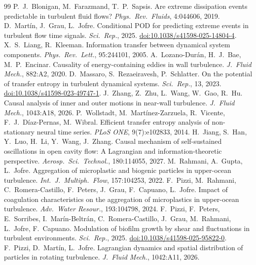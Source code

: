 \documentclass[11pt]{article}
\begin{document}
\begin{thebibliography}{99}
 P.\ J.\ Blonigan, M.\ Farazmand, T.\ P.\ Sapsis. Are extreme dissipation events predictable in turbulent fluid flows? \emph{Phys.\ Rev.\ Fluids}, 4:044606, 2019.
 D.\ Mart\'in, J.\ Grau, L.\ Jofre. Conditional POD for predicting extreme events in turbulent flow time signals. \emph{Sci.\ Rep.}, 2025. \href{https://doi.org/10.1038/s41598-025-14804-4}{doi:10.1038/s41598-025-14804-4}.
 X.\ S.\ Liang, R.\ Kleeman. Information transfer between dynamical system components. \emph{Phys.\ Rev.\ Lett.}, 95:244101, 2005.
 A.\ Lozano-Dur\'an, H.\ J.\ Bae, M.\ P.\ Encinar. Causality of energy-containing eddies in wall turbulence. \emph{J.\ Fluid Mech.}, 882:A2, 2020.
 D.\ Massaro, S.\ Rezaeiravesh, P.\ Schlatter. On the potential of transfer entropy in turbulent dynamical systems. \emph{Sci.\ Rep.}, 13, 2023. \href{https://doi.org/10.1038/s41598-023-49747-1}{doi:10.1038/s41598-023-49747-1}.
 J.\ Zhang, Z.\ Zhu, L.\ Wang, W.\ Gao, R.\ Hu. Causal analysis of inner and outer motions in near-wall turbulence. \emph{J.\ Fluid Mech.}, 1043:A18, 2026.
 P.\ Wollstadt, M.\ Mart\'inez-Zarzuela, R.\ Vicente, F.\ J.\ D\'iaz-Pernas, M.\ Wibral. Efficient transfer entropy analysis of non-stationary neural time series. \emph{PLoS ONE}, 9(7):e102833, 2014.
 H.\ Jiang, S.\ Han, Y.\ Luo, H.\ Li, Y.\ Wang, J.\ Zhang. Causal mechanism of self-sustained oscillations in open cavity flow: A Lagrangian and information-theoretic perspective. \emph{Aerosp.\ Sci.\ Technol.}, 180:114055, 2027.
 M.\ Rahmani, A.\ Gupta, L.\ Jofre. Aggregation of microplastic and biogenic particles in upper-ocean turbulence. \emph{Int.\ J.\ Multiph.\ Flow}, 157:104253, 2022.
 F.\ Pizzi, M.\ Rahmani, C.\ Romera-Castillo, F.\ Peters, J.\ Grau, F.\ Capuano, L.\ Jofre. Impact of coagulation characteristics on the aggregation of microplastics in upper-ocean turbulence. \emph{Adv.\ Water Resour.}, 193:104798, 2024.
 F.\ Pizzi, F.\ Peters, E.\ Sorribes, I.\ Mar\'in-Beltr\'an, C.\ Romera-Castillo, J.\ Grau, M.\ Rahmani, L.\ Jofre, F.\ Capuano. Modulation of biofilm growth by shear and fluctuations in turbulent environments. \emph{Sci.\ Rep.}, 2025. \href{https://doi.org/10.1038/s41598-025-95822-0}{doi:10.1038/s41598-025-95822-0}.
 F.\ Pizzi, D.\ Mart\'in, L.\ Jofre. Lagrangian dynamics and spatial distribution of particles in rotating turbulence. \emph{J.\ Fluid Mech.}, 1042:A11, 2026.

\end{thebibliography}
\end{document}
